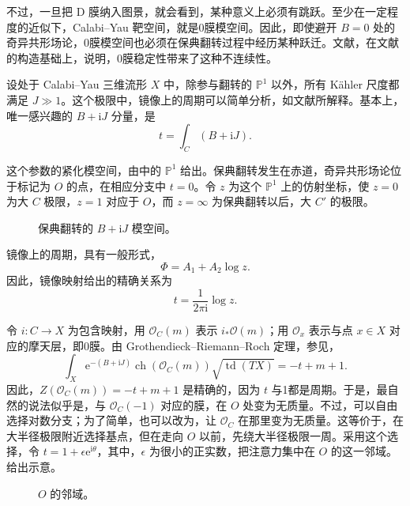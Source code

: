 不过，一旦把 D 膜纳入图景，就会看到，某种意义上必须有跳跃。至少在一定程度的近似下，Calabi--Yau 靶空间，就是0膜模空间。因此，即使避开 $B=0$ 处的奇异共形场论，0膜模空间也必须在保典翻转过程中经历某种跃迁。文献，在文献的构造基础上，说明，0膜稳定性带来了这种不连续性。

设处于 Calabi--Yau 三维流形 $X$ 中，除参与翻转的 $\mathbb{P}^1$ 以外，所有 K\"ahler 尺度都满足 $J\gg1$。这个极限中，镜像上的周期可以简单分析，如文献所解释。基本上，唯一感兴趣的 $B+\mathrm{i}J$ 分量，是
\begin{equation}\label{eq:5.154}
t=\int_C(B+\mathrm{i}J).
\end{equation}

这个参数的紧化模空间，由中的 $\mathbb{P}^1$ 给出。保典翻转发生在赤道，奇异共形场论位于标记为 $O$ 的点，在相应分支中 $t=0$。令 $z$ 为这个 $\mathbb{P}^1$ 上的仿射坐标，使 $z=0$ 为大 $C$ 极限，$z=1$ 对应于 $O$，而 $z=\infty$ 为保典翻转以后，大 $C'$ 的极限。
\begin{figure}[H]
\centering
{}
\caption{保典翻转的 $B+\mathrm{i}J$ 模空间。}\label{fig:5.10}
\end{figure}

镜像上的周期，具有一般形式，
\begin{equation}\label{eq:5.155}
\Phi=A_1+A_2\log z.
\end{equation}
因此，镜像映射给出的精确关系为
\begin{equation}\label{eq:5.156}
t=\frac{1}{2\pi\mathrm{i}}\log z.
\end{equation}

令 $i\colon C\to X$ 为包含映射，用 $\mathcal{O}_C(m)$ 表示 $i_*\mathcal{O}(m)$；用 $\mathcal{O}_x$ 表示与点 $x\in X$ 对应的摩天层，即0膜。由 Grothendieck--Riemann--Roch 定理，参见，
\begin{equation}\label{eq:5.157}
\int_X\mathrm{e}^{-(B+\mathrm{i}J)}
\operatorname{ch}(\mathcal{O}_C(m))\sqrt{\operatorname{td}(TX)}
=-t+m+1.
\end{equation}
因此，$Z(\mathcal{O}_C(m))=-t+m+1$ 是精确的，因为 $t$ 与1都是周期。于是，最自然的说法似乎是，与 $\mathcal{O}_C(-1)$ 对应的膜，在 $O$ 处变为无质量。不过，可以自由选择对数分支；为了简单，也可以改为，让 $\mathcal{O}_C$ 在那里变为无质量。这等价于，在大半径极限附近选择基点，但在走向 $O$ 以前，先绕大半径极限一周。采用这个选择，令 $t=1+\epsilon\mathrm{e}^{\mathrm{i}\theta}$，其中，$\epsilon$ 为很小的正实数，把注意力集中在 $O$ 的这一邻域。给出示意。
\begin{figure}[H]
\centering
{}
\caption{$O$ 的邻域。}\label{fig:5.11}
\end{figure}

